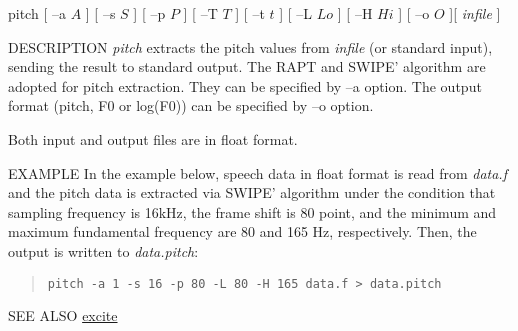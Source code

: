 \begin{synopsis}
 \item[pitch] [ --a $A$ ] [ --s $S$ ] [ --p $P$ ] [ --T $T$ ] [ --t $t$ ]
 [ --L $Lo$ ] [ --H $Hi$ ] [ --o $O$ ][ {\em infile} ]
\end{synopsis}

\begin{qsection}{DESCRIPTION}
{\em pitch} extracts the pitch values from {\em infile} (or standard input),
sending the result to standard output.
The RAPT \cite{ref:pitch-RAPT} and SWIPE'
 algorithm are adopted for pitch extraction.
They can be specified by --a option.
The output format (pitch, F0 or log(F0)) can be specified by --o option.

Both input and output files are in float format.

\end{qsection}

\begin{options}
\end{options}

\begin{qsection}{EXAMPLE}
 In the example below, speech data in float format
 is read from {\em data.f} and the pitch data is extracted via SWIPE' algorithm
 under the condition that sampling frequency is 16kHz,
 the frame shift is 80 point,
 and the minimum and maximum fundamental frequency are
 80 and 165 Hz, respectively.
 Then, the output is written to {\em data.pitch}:
 \begin{quote}
  \verb!pitch -a 1 -s 16 -p 80 -L 80 -H 165 data.f > data.pitch!
 \end{quote}
\end{qsection}

\begin{qsection}{SEE ALSO}
\hyperlink{excite}{excite}
\end{qsection}
